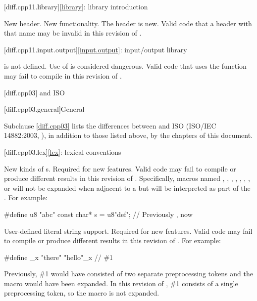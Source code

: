 [diff.cpp11.library]{\ref{library}: library introduction}

\change
New header.
\rationale
New functionality.
\effect
The \Cpp{} header  is new.
Valid \CppXI{} code that  a header with that name may be
invalid in this revision of \Cpp{}.

[diff.cpp11.input.output]{\ref{input.output}: input/output library}

\change
{} is not defined.
\rationale
Use of  is considered dangerous.
\effect
Valid \CppXI{} code that uses the  function may fail to compile
in this revision of \Cpp{}.

[diff.cpp03]{\Cpp{} and ISO \CppIII{}}

[diff.cpp03.general]{General}

\pnum
{}%
Subclause \ref{diff.cpp03} lists the differences between \Cpp{} and
ISO \CppIII{} (ISO/IEC 14882:2003, ),
in addition to those listed above,
by the chapters of this document.

[diff.cpp03.lex]{\ref{lex}: lexical conventions}

\change
New kinds of s.
\rationale
Required for new features.
\effect
Valid \CppIII{} code may fail to compile or produce different results in
this revision of \Cpp{}. Specifically, macros named , ,
, , , , , or  will
not be expanded when adjacent to a  but will be interpreted as
part of the .
For example:
\begin{codeblock}
#define u8 "abc"
const char* s = u8"def";        // Previously , now 
\end{codeblock}

\change
User-defined literal string support.
\rationale
Required for new features.
\effect
Valid \CppIII{} code may fail to compile or produce different results in
this revision of \Cpp{}.
For example:
\begin{codeblock}
#define _x "there"
"hello"_x           // \#1
\end{codeblock}

Previously, \#1 would have consisted of two separate preprocessing tokens and
the macro  would have been expanded. In this revision of \Cpp{},
\#1 consists of a single preprocessing token, so the macro is not expanded.

